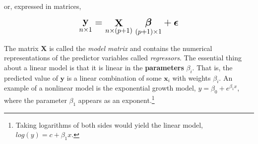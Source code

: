 \documentclass[
  letterpaper,
  10pt,
  krantz2]{krantz}
\begin{document}
or, expressed in matrices,

\[
\Large{\mathord{\mathop{\mathbf{y}}\limits_{n \times 1}} = \mathord{\mathop{\mathbf{X}}\limits_{n \times (p+1)}}\; \mathord{\mathop{\mathbf{\boldsymbol{\beta}}}\limits_{(p+1) \times 1}} + \boldsymbol{\epsilon}}
\]

The matrix \(\mathbf{X}\) is called the \emph{model matrix} and contains
the numerical representations of the predictor variables called
\emph{regressors}. The essential thing about a linear model is that it
is linear in the \textbf{parameters} \(\beta_i\). That is, the predicted
value of \(\mathbf{y}\) is a linear combination of some \(\mathbf{x}_i\)
with weights \(\beta_i\). An example of a nonlinear model is the
exponential growth model, \(y = \beta_0 + e^{\beta_1 x}\), where the
parameter \(\beta_1\) appears as an exponent.\footnote{Taking logarithms
  of both sides would yield the linear model,
  \(log(y) = c + \beta_1 x\).}
\end{document}
